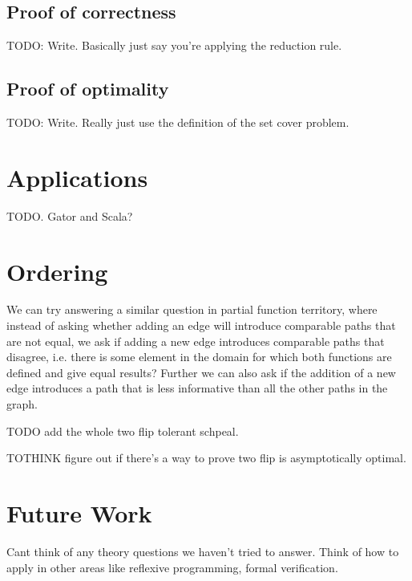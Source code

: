 \documentclass{article}
\begin{document}
\subsection{Proof of correctness}
TODO: Write. Basically just say you're applying the reduction rule.

\subsection{Proof of optimality}
TODO: Write. Really just use the definition of the set cover problem.

\section{Applications}

TODO. Gator and Scala?

\section{Ordering}
We can try answering a similar question in partial function territory, where instead of asking whether adding an edge will introduce comparable paths that are not equal, we ask if adding a new edge introduces comparable paths that disagree, i.e. there is some element in the domain for which both functions are defined and give equal results? Further we can also ask if the addition of a new edge introduces a path that is less informative than all the other paths in the graph.

TODO add the whole two flip tolerant schpeal.

TOTHINK figure out if there's a way to prove two flip is asymptotically optimal.

\section{Future Work}
Cant think of any theory questions we haven't tried to answer.
Think of how to apply in other areas like reflexive programming, formal verification.
\end{document}
